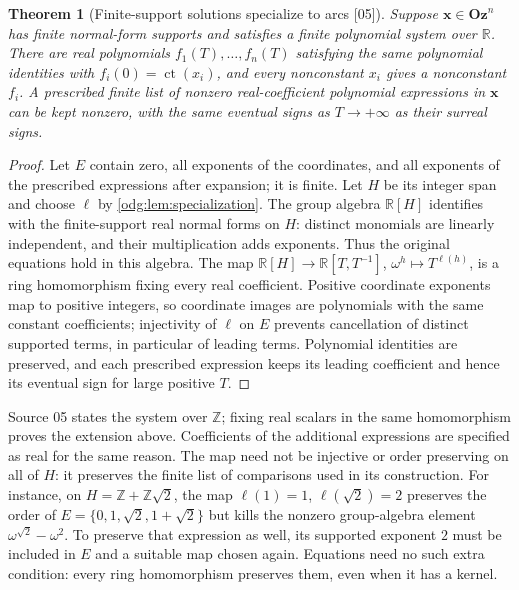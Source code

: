 \documentclass[11pt,oneside]{article}
\numberwithin{equation}{section}
\newtheorem{theorem}{Theorem}[section]
\theoremstyle{definition}
\theoremstyle{remark}
\newcommand{\Oz}{\mathbf{Oz}}
\newcommand{\Z}{\mathbb Z}
\newcommand{\R}{\mathbb R}
\newcommand{\ct}{\operatorname{ct}}
\newcommand{\src}[1]{\textup{\textsf{\small[#1]}}}
\begin{document}
\begin{theorem}[Finite-support solutions specialize to arcs \src{05}]\label{odg:thm:specialization}
Suppose $\mathbf x\in\Oz^n$ has finite normal-form supports and satisfies a
finite polynomial system over $\R$. There are real polynomials
$f_1(T),\ldots,f_n(T)$ satisfying the same polynomial identities with
$f_i(0)=\ct(x_i)$, and every nonconstant $x_i$ gives a nonconstant $f_i$. A
prescribed finite list of nonzero real-coefficient polynomial expressions
in $\mathbf x$ can
be kept nonzero, with the same eventual signs as $T\to+\infty$ as their
surreal signs.
\end{theorem}
\begin{proof}
Let $E$ contain zero, all exponents of the coordinates, and all exponents of
the prescribed expressions after expansion; it is finite. Let $H$ be its
integer span and choose $\ell$ by \cref{odg:lem:specialization}. The
group algebra $\R[H]$ identifies with the finite-support real normal forms
on $H$: distinct monomials are linearly independent, and their multiplication
adds exponents. Thus the original equations hold in this algebra. The map
$\R[H]\to\R[T,T^{-1}]$, $\omega^h\mapsto T^{\ell(h)}$, is a ring
homomorphism fixing every real coefficient. Positive coordinate exponents map to positive integers,
so coordinate images are polynomials with the same constant coefficients;
injectivity of $\ell$ on $E$ prevents cancellation of distinct supported
terms, in particular of leading terms. Polynomial identities are preserved,
and each prescribed expression keeps its leading coefficient and hence its
eventual sign for large positive $T$.
\end{proof}

Source 05 states the system over $\Z$; fixing real scalars in the same
homomorphism proves the extension above. Coefficients of the additional
expressions are specified as real for the same reason. The map need not be
injective or order preserving on all of $H$: it preserves the finite list
of comparisons used in its construction. For instance, on
$H=\Z+\Z\sqrt2$, the map $\ell(1)=1$, $\ell(\sqrt2)=2$ preserves the order
of $E=\{0,1,\sqrt2,1+\sqrt2\}$ but kills the nonzero group-algebra element
$\omega^{\sqrt2}-\omega^2$. To preserve that expression as well, its
supported exponent $2$ must be included in $E$ and a suitable map chosen
again. Equations need no such extra condition: every ring homomorphism
preserves them, even when it has a kernel.
\end{document}
